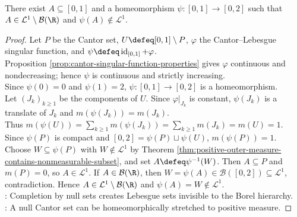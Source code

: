 \begin{theorem} \label{thm:lebesgue-measurable-non-borel-set-exists} \\
There exist $A\subseteq[0,1]$ and a homeomorphism $\psi:[0,1]\to[0,2]$ such that $A\in\mathcal{L}^1\setminus\mathcal{B}(\R)$ and $\psi(A)\notin\mathcal{L}^1$.
\begin{proof} Let $P$ be the Cantor set, $U\defeq[0,1]\setminus P$, $\varphi$ the Cantor--Lebesgue singular function, and $\psi\defeq\operatorname{id}_{[0,1]}+\varphi$.\\
Proposition \ref{prop:cantor-singular-function-properties} gives $\varphi$ continuous and nondecreasing; hence $\psi$ is continuous and strictly increasing.\\
Since $\psi(0)=0$ and $\psi(1)=2$, $\psi:[0,1]\to[0,2]$ is a homeomorphism.\\
Let $(J_k)_{k\geq1}$ be the components of $U$. Since $\varphi|_{J_k}$ is constant, $\psi(J_k)$ is a translate of $J_k$ and $m(\psi(J_k))=m(J_k)$.\\
Thus $m(\psi(U))=\sum\limits_{k\geq1}m(\psi(J_k))=\sum\limits_{k\geq1}m(J_k)=m(U)=1$.\\
Since $\psi(P)$ is compact and $[0,2]=\psi(P)\sqcup\psi(U)$, $m(\psi(P))=1$.\\
Choose $W\subseteq\psi(P)$ with $W\notin\mathcal{L}^1$ by Theorem \ref{thm:positive-outer-measure-contains-nonmeasurable-subset}, and set $A\defeq\psi^{-1}(W)$. Then $A\subseteq P$ and $m(P)=0$, so $A\in\mathcal{L}^1$. If $A\in\mathcal{B}(\R)$, then $W=\psi(A)\in\mathcal{B}([0,2])\subseteq\mathcal{L}^1$, contradiction. Hence $A\in\mathcal{L}^1\setminus\mathcal{B}(\R)$ and $\psi(A)=W\notin\mathcal{L}^1$.\\
: Completion by null sets creates Lebesgue sets invisible to the Borel hierarchy.\\
: A null Cantor set can be homeomorphically stretched to positive measure.
\end{proof}
\end{theorem}
